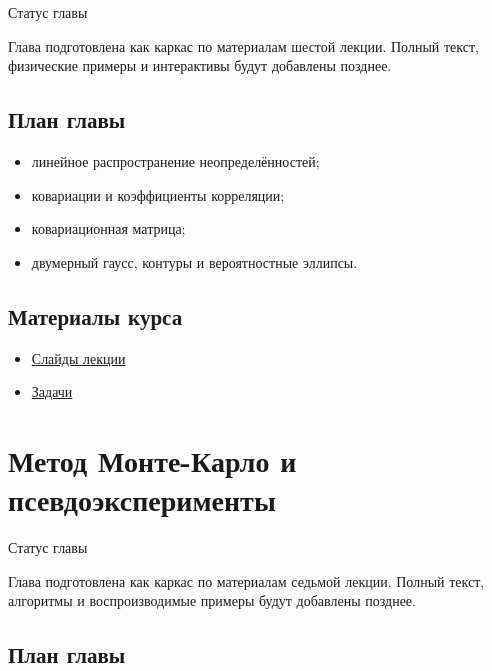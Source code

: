 \documentclass[
  russian,
  letterpaper,
]{scrbook}
\providecommand{\tightlist}{%
  \setlength{\itemsep}{0pt}\setlength{\parskip}{0pt}}
\begin{document}
{Статус главы}

Глава подготовлена как каркас по материалам шестой лекции. Полный текст,
физические примеры и интерактивы будут добавлены позднее.

\section{План
главы}\label{ux43fux43bux430ux43d-ux433ux43bux430ux432ux44b-4}

\begin{itemize}
\tightlist
\item
  линейное распространение неопределённостей;
\item
  ковариации и коэффициенты корреляции;
\item
  ковариационная матрица;
\item
  двумерный гаусс, контуры и вероятностные эллипсы.
\end{itemize}

\section{Материалы
курса}\label{ux43cux430ux442ux435ux440ux438ux430ux43bux44b-ux43aux443ux440ux441ux430-3}

\begin{itemize}
\tightlist
\item
  \href{https://neutrinohit.github.io/statistical-analysis-course/ru/slides/05_error_propagation_and_covariance.html}{Слайды
  лекции}
\item
  \href{https://neutrinohit.github.io/statistical-analysis-course/ru/slides/exercises/05_error_propagation_and_covariance_exercises.html}{Задачи}
\end{itemize}

\chapter{Метод Монте-Карло и
псевдоэксперименты}\label{ux43cux435ux442ux43eux434-ux43cux43eux43dux442ux435-ux43aux430ux440ux43bux43e-ux438-ux43fux441ux435ux432ux434ux43eux44dux43aux441ux43fux435ux440ux438ux43cux435ux43dux442ux44b}

{Статус главы}

Глава подготовлена как каркас по материалам седьмой лекции. Полный
текст, алгоритмы и воспроизводимые примеры будут добавлены позднее.

\section{План
главы}\label{ux43fux43bux430ux43d-ux433ux43bux430ux432ux44b-5}
\end{document}
